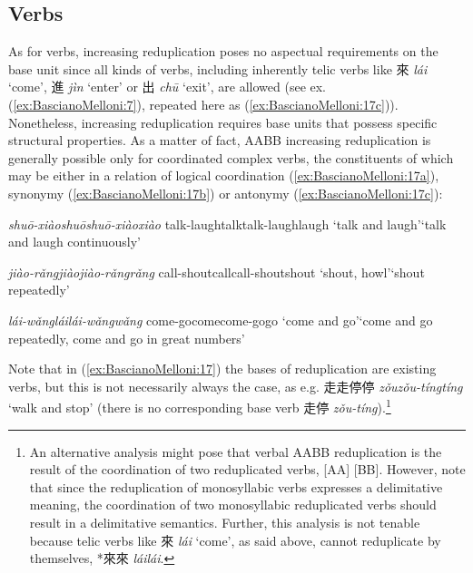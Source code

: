 \documentclass[output=paper]{langsci/langscibook}
\begin{document}
\subsection{Verbs}
As for verbs, increasing reduplication poses no aspectual requirements
on the base unit since all kinds of verbs, including inherently telic
verbs like 來 \emph{lái} `come', 進 \emph{jìn} `enter' or 出 \emph{chū}
`exit', are allowed (see ex. (\ref{ex:BascianoMelloni:7}), repeated here as (\ref{ex:BascianoMelloni:17c})). Nonetheless,
increasing reduplication requires base units that possess specific
structural properties. As a matter of fact, AABB increasing
reduplication is generally possible only for coordinated complex verbs,
the constituents of which may be either in a relation of logical
coordination (\ref{ex:BascianoMelloni:17a}), synonymy (\ref{ex:BascianoMelloni:17b}) or antonymy (\ref{ex:BascianoMelloni:17c}):

\ea\label{ex:BascianoMelloni:17}

\ea\label{ex:BascianoMelloni:17a}%
        {\emph{shuō-xiào}}{\emph{shuō\tld{}shuō-xiào\tld{}xiào}}%
        {talk-laugh}{talk\tld{}talk-laugh\tld{}laugh}%
        {`talk and laugh'}{`talk and laugh continuously'}%

\ex\label{ex:BascianoMelloni:17b}%
        {\emph{jiào-rǎng}}{\emph{jiào\tld{}jiào-rǎng\tld{}rǎng}}%
        {call-shout}{call\tld{}call-shout\tld{}shout}%
        {`shout, howl'}{`shout repeatedly'}%

\ex\label{ex:BascianoMelloni:17c}%
        {\emph{lái-wǎng}}{\emph{lái\tld{}lái-wǎng\tld{}wǎng}}%
        {come-go}{come\tld{}come-go\tld{}go}%
        {`come and go'}{`come and go repeatedly, come and go in great numbers'}%
\z\z

Note that in (\ref{ex:BascianoMelloni:17}) the bases of reduplication are existing verbs, but
this is not necessarily always the case, as e.g.  走走停停
\emph{zǒu\tld{}zǒu-tíng\tld{}tíng} `walk and stop'
(there is no corresponding base verb 走停 \emph{zǒu-tíng}).\footnote{An
  alternative analysis might pose that verbal AABB reduplication is the
  result of the coordination of two reduplicated verbs,
  {[}A\emph{\tld{}}A{]} {[}B\emph{\tld{}}B{]}.
  However, note that since the reduplication of monosyllabic verbs
  expresses a delimitative meaning, the coordination of two monosyllabic
  reduplicated verbs should result in a delimitative semantics. Further,
  this analysis is not tenable because telic verbs like 來 \emph{lái}
  `come', as said above, cannot reduplicate by themselves, \mbox{*來來}
  \emph{lái\tld{}lái}.}
\end{document}
